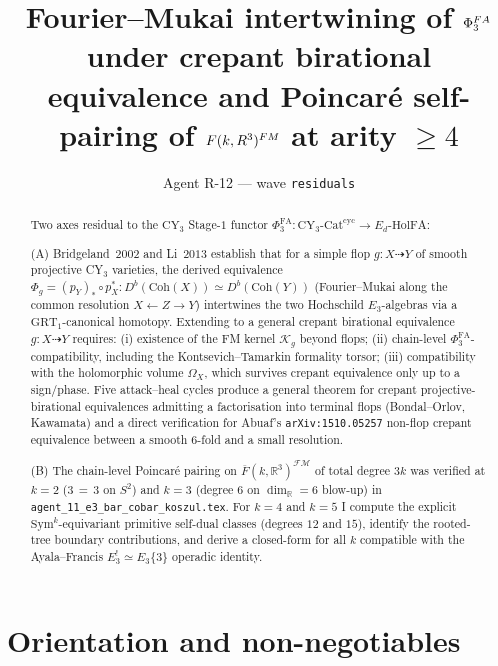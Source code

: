 \documentclass[11pt]{article}
\title{Fourier--Mukai intertwining of $\PhiFA_3$ under crepant birational
equivalence and Poincar\'e self-pairing of $\FMbar(k,\RR^3)^{\FM}$ at
arity $\geq 4$}
\author{Agent R-12 --- wave \texttt{residuals}}
\date{}
\theoremstyle{definition}
\theoremstyle{remark}
\providecommand{\FMbar}{\overline{F}}
\providecommand{\FM}{\mathcal{FM}}
\providecommand{\PhiFA}{\Phi^{\mathrm{FA}}}
\providecommand{\CY}{\mathrm{CY}}
\providecommand{\Coh}{\mathrm{Coh}}
\providecommand{\FM}{\mathrm{FM}}
\providecommand{\cK}{\mathcal{K}}
\providecommand{\RR}{\mathbb{R}}
\providecommand{\GRT}{\mathrm{GRT}}
\providecommand{\Sym}{\mathrm{Sym}}
\providecommand{\EdHolFA}{E_d\text{-}\mathrm{HolFA}}
\begin{document}
\maketitle

\begin{abstract}
Two axes residual to the $\CY_3$ Stage-$1$ functor
$\PhiFA_3 \colon \CY_3\text{-}\mathrm{Cat}^{\mathrm{cyc}} \to
\EdHolFA$:

(A) Bridgeland~$2002$ and Li~$2013$ establish that for a simple flop
$g \colon X \dashrightarrow Y$ of smooth projective CY$_3$ varieties,
the derived equivalence
$\Phi_g = (p_Y)_* \circ p_X^* \colon D^b(\Coh(X)) \simeq D^b(\Coh(Y))$
(Fourier--Mukai along the common resolution $X \leftarrow Z \rightarrow Y$)
intertwines the two Hochschild $E_3$-algebras via a $\GRT_1$-canonical
homotopy. Extending to a general crepant birational
equivalence $g \colon X \dashrightarrow Y$ requires: (i) existence
of the FM kernel $\cK_g$ beyond flops; (ii) chain-level
$\PhiFA_3$-compatibility, including the Kontsevich--Tamarkin formality
torsor; (iii) compatibility with the holomorphic volume $\Omega_X$,
which survives crepant equivalence only up to a sign/phase. Five
attack--heal cycles produce a general theorem for crepant
projective-birational equivalences admitting a factorisation into
terminal flops (Bondal--Orlov, Kawamata) and a direct verification for
Abuaf's \texttt{arXiv:1510.05257} non-flop crepant equivalence between
a smooth $6$-fold and a small resolution.

(B) The chain-level Poincar\'e pairing on
$\FMbar(k,\RR^3)^{\FM}$ of total degree $3k$ was verified at $k=2$
($3\,{=}\,3$ on $S^2$) and $k=3$ (degree $6$ on $\dim_\RR = 6$
blow-up) in \texttt{agent\_11\_e3\_bar\_cobar\_koszul.tex}. For $k=4$
and $k=5$ I compute the explicit $\Sym^k$-equivariant primitive
self-dual classes (degrees $12$ and $15$), identify the
rooted-tree boundary contributions, and derive a closed-form
for all $k$ compatible with the Ayala--Francis
$E_3^{!} \simeq E_3\{3\}$ operadic identity.
\end{abstract}

\tableofcontents

\section{Orientation and non-negotiables}
\end{document}
